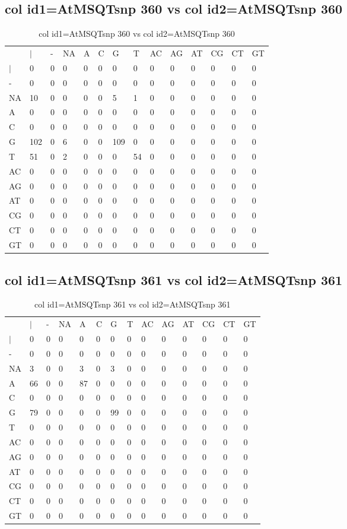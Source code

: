 \subsection{col id1=AtMSQTsnp 360 vs col id2=AtMSQTsnp 360}
\begin{center}
\begin{longtable}{|l|l|l|l|l|l|l|l|l|l|l|l|l|l|}
\caption{col id1=AtMSQTsnp 360 vs col id2=AtMSQTsnp 360} \label{table_dm876}\\
\hline
\\
\hline
&$|$&-&NA&A&C&G&T&AC&AG&AT&CG&CT&GT\\
$|$&0&0&0&0&0&0&0&0&0&0&0&0&0\\
-&0&0&0&0&0&0&0&0&0&0&0&0&0\\
NA&10&0&0&0&0&5&1&0&0&0&0&0&0\\
A&0&0&0&0&0&0&0&0&0&0&0&0&0\\
C&0&0&0&0&0&0&0&0&0&0&0&0&0\\
G&102&0&6&0&0&109&0&0&0&0&0&0&0\\
T&51&0&2&0&0&0&54&0&0&0&0&0&0\\
AC&0&0&0&0&0&0&0&0&0&0&0&0&0\\
AG&0&0&0&0&0&0&0&0&0&0&0&0&0\\
AT&0&0&0&0&0&0&0&0&0&0&0&0&0\\
CG&0&0&0&0&0&0&0&0&0&0&0&0&0\\
CT&0&0&0&0&0&0&0&0&0&0&0&0&0\\
GT&0&0&0&0&0&0&0&0&0&0&0&0&0\\
\hline
\end{longtable}
\end{center}

\subsection{col id1=AtMSQTsnp 361 vs col id2=AtMSQTsnp 361}
\begin{center}
\begin{longtable}{|l|l|l|l|l|l|l|l|l|l|l|l|l|l|}
\caption{col id1=AtMSQTsnp 361 vs col id2=AtMSQTsnp 361} \label{table_dm878}\\
\hline
\\
\hline
&$|$&-&NA&A&C&G&T&AC&AG&AT&CG&CT&GT\\
$|$&0&0&0&0&0&0&0&0&0&0&0&0&0\\
-&0&0&0&0&0&0&0&0&0&0&0&0&0\\
NA&3&0&0&3&0&3&0&0&0&0&0&0&0\\
A&66&0&0&87&0&0&0&0&0&0&0&0&0\\
C&0&0&0&0&0&0&0&0&0&0&0&0&0\\
G&79&0&0&0&0&99&0&0&0&0&0&0&0\\
T&0&0&0&0&0&0&0&0&0&0&0&0&0\\
AC&0&0&0&0&0&0&0&0&0&0&0&0&0\\
AG&0&0&0&0&0&0&0&0&0&0&0&0&0\\
AT&0&0&0&0&0&0&0&0&0&0&0&0&0\\
CG&0&0&0&0&0&0&0&0&0&0&0&0&0\\
CT&0&0&0&0&0&0&0&0&0&0&0&0&0\\
GT&0&0&0&0&0&0&0&0&0&0&0&0&0\\
\hline
\end{longtable}
\end{center}

